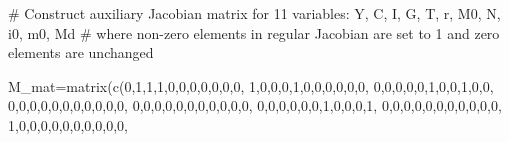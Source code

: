 \documentclass[
  letterpaper,
  DIV=11,
  numbers=noendperiod]{scrreprt}
\newenvironment{Shaded}{\begin{snugshade}}{\end{snugshade}}
\newcommand{\CommentTok}[1]{\textcolor[rgb]{0.37,0.37,0.37}{#1}}
\newcommand{\DecValTok}[1]{\textcolor[rgb]{0.68,0.00,0.00}{#1}}
\newcommand{\FunctionTok}[1]{\textcolor[rgb]{0.28,0.35,0.67}{#1}}
\newcommand{\NormalTok}[1]{\textcolor[rgb]{0.00,0.23,0.31}{#1}}
\newcommand{\OtherTok}[1]{\textcolor[rgb]{0.00,0.23,0.31}{#1}}
\begin{document}
\begin{Shaded}
\begin{Highlighting}[]
\CommentTok{\# Construct auxiliary Jacobian matrix for 11 variables: Y, C, I, G, T, r, M0, N, i0, m0, Md}
\CommentTok{\# where non{-}zero elements in regular Jacobian are set to 1 and zero elements are unchanged}

\NormalTok{M\_mat}\OtherTok{=}\FunctionTok{matrix}\NormalTok{(}\FunctionTok{c}\NormalTok{(}\DecValTok{0}\NormalTok{,}\DecValTok{1}\NormalTok{,}\DecValTok{1}\NormalTok{,}\DecValTok{1}\NormalTok{,}\DecValTok{0}\NormalTok{,}\DecValTok{0}\NormalTok{,}\DecValTok{0}\NormalTok{,}\DecValTok{0}\NormalTok{,}\DecValTok{0}\NormalTok{,}\DecValTok{0}\NormalTok{,}\DecValTok{0}\NormalTok{,}
              \DecValTok{1}\NormalTok{,}\DecValTok{0}\NormalTok{,}\DecValTok{0}\NormalTok{,}\DecValTok{0}\NormalTok{,}\DecValTok{1}\NormalTok{,}\DecValTok{0}\NormalTok{,}\DecValTok{0}\NormalTok{,}\DecValTok{0}\NormalTok{,}\DecValTok{0}\NormalTok{,}\DecValTok{0}\NormalTok{,}\DecValTok{0}\NormalTok{,}
              \DecValTok{0}\NormalTok{,}\DecValTok{0}\NormalTok{,}\DecValTok{0}\NormalTok{,}\DecValTok{0}\NormalTok{,}\DecValTok{0}\NormalTok{,}\DecValTok{1}\NormalTok{,}\DecValTok{0}\NormalTok{,}\DecValTok{0}\NormalTok{,}\DecValTok{1}\NormalTok{,}\DecValTok{0}\NormalTok{,}\DecValTok{0}\NormalTok{,}
              \DecValTok{0}\NormalTok{,}\DecValTok{0}\NormalTok{,}\DecValTok{0}\NormalTok{,}\DecValTok{0}\NormalTok{,}\DecValTok{0}\NormalTok{,}\DecValTok{0}\NormalTok{,}\DecValTok{0}\NormalTok{,}\DecValTok{0}\NormalTok{,}\DecValTok{0}\NormalTok{,}\DecValTok{0}\NormalTok{,}\DecValTok{0}\NormalTok{,}
              \DecValTok{0}\NormalTok{,}\DecValTok{0}\NormalTok{,}\DecValTok{0}\NormalTok{,}\DecValTok{0}\NormalTok{,}\DecValTok{0}\NormalTok{,}\DecValTok{0}\NormalTok{,}\DecValTok{0}\NormalTok{,}\DecValTok{0}\NormalTok{,}\DecValTok{0}\NormalTok{,}\DecValTok{0}\NormalTok{,}\DecValTok{0}\NormalTok{,}
              \DecValTok{0}\NormalTok{,}\DecValTok{0}\NormalTok{,}\DecValTok{0}\NormalTok{,}\DecValTok{0}\NormalTok{,}\DecValTok{0}\NormalTok{,}\DecValTok{0}\NormalTok{,}\DecValTok{1}\NormalTok{,}\DecValTok{0}\NormalTok{,}\DecValTok{0}\NormalTok{,}\DecValTok{0}\NormalTok{,}\DecValTok{1}\NormalTok{,}
              \DecValTok{0}\NormalTok{,}\DecValTok{0}\NormalTok{,}\DecValTok{0}\NormalTok{,}\DecValTok{0}\NormalTok{,}\DecValTok{0}\NormalTok{,}\DecValTok{0}\NormalTok{,}\DecValTok{0}\NormalTok{,}\DecValTok{0}\NormalTok{,}\DecValTok{0}\NormalTok{,}\DecValTok{0}\NormalTok{,}\DecValTok{0}\NormalTok{,}
              \DecValTok{1}\NormalTok{,}\DecValTok{0}\NormalTok{,}\DecValTok{0}\NormalTok{,}\DecValTok{0}\NormalTok{,}\DecValTok{0}\NormalTok{,}\DecValTok{0}\NormalTok{,}\DecValTok{0}\NormalTok{,}\DecValTok{0}\NormalTok{,}\DecValTok{0}\NormalTok{,}\DecValTok{0}\NormalTok{,}\DecValTok{0}\NormalTok{,}

\end{Highlighting}
\end{Shaded}
\end{document}
